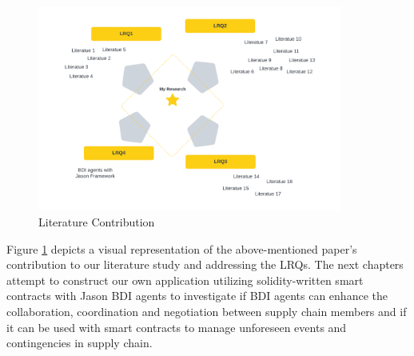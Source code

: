 \begin{figure}[h]
\centering
  \includegraphics[width=10cm]{includes/figures/related work.png} 
  \caption{Literature Contribution}
  \label{related work}
\end{figure}

Figure \ref{related work} depicts a visual representation of the above-mentioned paper's contribution to our literature study and addressing the LRQs. The next chapters attempt to construct our own application utilizing solidity-written smart contracts with Jason \ac{BDI} agents to investigate if \ac{BDI} agents can enhance the collaboration, coordination and negotiation between supply chain members and if it can be used with smart contracts to manage unforeseen events and contingencies in supply chain.